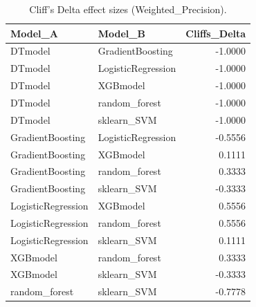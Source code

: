 \begin{table}[t]
\centering
\begin{tabular}{llr}
\toprule
Model_A & Model_B & Cliffs_Delta \\
\midrule
DTmodel & GradientBoosting & -1.0000 \\
DTmodel & LogisticRegression & -1.0000 \\
DTmodel & XGBmodel & -1.0000 \\
DTmodel & random_forest & -1.0000 \\
DTmodel & sklearn_SVM & -1.0000 \\
GradientBoosting & LogisticRegression & -0.5556 \\
GradientBoosting & XGBmodel & 0.1111 \\
GradientBoosting & random_forest & 0.3333 \\
GradientBoosting & sklearn_SVM & -0.3333 \\
LogisticRegression & XGBmodel & 0.5556 \\
LogisticRegression & random_forest & 0.5556 \\
LogisticRegression & sklearn_SVM & 0.1111 \\
XGBmodel & random_forest & 0.3333 \\
XGBmodel & sklearn_SVM & -0.3333 \\
random_forest & sklearn_SVM & -0.7778 \\
\bottomrule
\end{tabular}
\caption{Cliff's Delta effect sizes (Weighted_Precision).}
\label{tab:cliffs_Weighted_Precision}
\end{table}